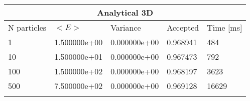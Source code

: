 \begin{tabular}{|l|l|l|l|l|}
\hline 
\multicolumn{5}{|c|}{Analytical 3D}\\ 
\hline 
N particles & $<E>$ & Variance & Accepted & Time [ms]\\ 
 \hline 
1 & 1.500000e+00 & 0.000000e+00 & 0.968941 & 484 \\ \hline 
10 & 1.500000e+01 & 0.000000e+00 & 0.967473 & 792 \\ \hline 
100 & 1.500000e+02 & 0.000000e+00 & 0.968197 & 3623 \\ \hline 
500 & 7.500000e+02 & 0.000000e+00 & 0.969128 & 16629 \\ \hline 
\label{h:a3} 
\end{tabular}